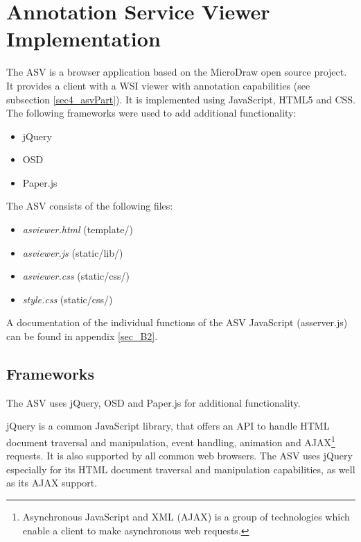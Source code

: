 \section{Annotation Service Viewer Implementation}

The ASV is a browser application based on the MicroDraw open source project. It provides a client with a WSI viewer with annotation capabilities (see subsection \ref{sec4_asvPart}). It is implemented using JavaScript, HTML5 and CSS. The following frameworks were used to add additional functionality:

\begin{itemize}
	\item jQuery
	\item OSD
	\item Paper.js
\end{itemize}

The ASV consists of the following files:

\begin{itemize}
	\item \emph{as{\textunderscore}viewer.html} (template/)
	\item \emph{as{\textunderscore}viewer.js} (static/lib/)
	\item \emph{as{\textunderscore}viewer.css} (static/css/)
	\item \emph{style.css} (static/css/)
\end{itemize}

A documentation of the individual functions of the ASV JavaScript (as{\textunderscore}server.js) can be found in appendix \ref{sec_B2}.

\subsection{Frameworks}
\label{sec4_asvFrameworks}
The ASV uses jQuery, OSD and Paper.js for additional functionality.

jQuery is a common JavaScript library, that offers an API to handle HTML document traversal and manipulation, event handling, animation and AJAX\footnote{
	Asynchronous JavaScript and XML (AJAX) is a group of technologies which enable a client to make asynchronous web requests\cite{Ullman07}.
} requests\cite{web:jquery}. It is also supported by all common web browsers\cite{web:jqueryBS}. The ASV uses jQuery especially for its HTML document traversal and manipulation capabilities, as well as its AJAX support.

